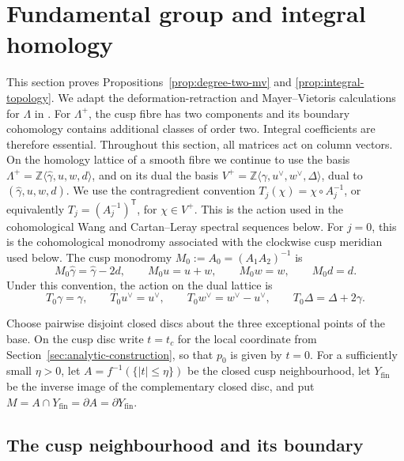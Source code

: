 \documentclass[11pt]{article}
\theoremstyle{definition}
\theoremstyle{remark}
\numberwithin{equation}{section}
\begin{document}
\section{Fundamental group and integral homology}\label{sec:topology}

This section proves Propositions~\ref{prop:degree-two-mv} and
\ref{prop:integral-topology}.
We adapt the deformation-retraction and Mayer--Vietoris calculations for
$\Lambda$ in
\citep[Sections~7.1--7.6 and Appendix~A]{Alpoge2026}.  For $\Lambda^+$,
the cusp fibre has two components and its boundary cohomology contains
additional classes of order two.  Integral coefficients are therefore
essential.
Throughout this section, all matrices act on column vectors.
On the homology lattice of a smooth fibre we continue to use the basis
$\Lambda^+=\mathbb Z\langle \widehat\gamma,u,w,d\rangle$,
and on its dual the basis
$V^+=\mathbb Z\langle\gamma,u^\vee,w^\vee,\Delta\rangle$, dual to
$(\widehat\gamma,u,w,d)$.  We use the contragredient convention
$T_j(\chi)=\chi\circ A_j^{-1}$, or equivalently
$T_j=(A_j^{-1})^{\mathsf T}$, for $\chi\in V^+$.
This is the action used in the cohomological Wang and Cartan--Leray spectral
sequences below.
For $j=0$, this is the cohomological monodromy associated with the clockwise
cusp meridian used below.  The cusp monodromy
$M_0:=A_0=(A_1A_2)^{-1}$ is
\begin{equation}\label{eq:cusp-monodromy-homology}
 M_0\widehat\gamma=\widehat\gamma-2d,\qquad
 M_0u=u+w,\qquad M_0w=w,\qquad M_0d=d.
\end{equation}
Under this convention, the action on the dual lattice is
\begin{equation}\label{eq:cusp-monodromy-cohomology}
 T_0\gamma=\gamma,\qquad T_0u^\vee=u^\vee,\qquad
 T_0w^\vee=w^\vee-u^\vee,\qquad T_0\Delta=\Delta+2\gamma.
\end{equation}%

Choose pairwise disjoint closed discs about the three exceptional points of
the base.  On the cusp disc write $t=t_c$ for the local coordinate from
Section~\ref{sec:analytic-construction}, so that $p_0$ is given by $t=0$.
For a sufficiently small $\eta>0$, let
$A=f^{-1}(\{|t|\leq\eta\})$ be the closed cusp neighbourhood, let
$Y_{\mathrm{fin}}$ be the inverse
image of the complementary closed disc, and put
$M=A\cap Y_{\mathrm{fin}}=\partial A=\partial Y_{\mathrm{fin}}$.

\subsection{The cusp neighbourhood and its boundary}
\end{document}

